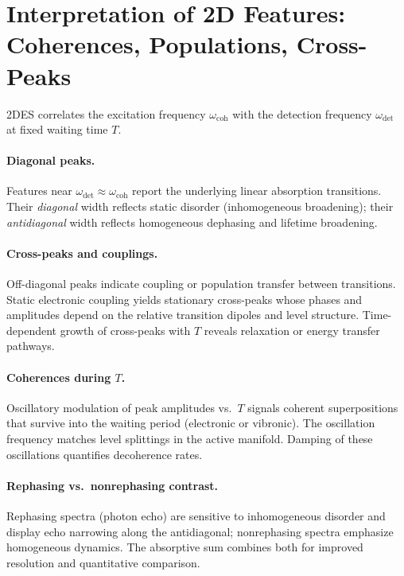 \section{Interpretation of 2D Features: Coherences, Populations, Cross-Peaks}
\label{copy:sec:interpretation}
\noindent
2DES correlates the excitation frequency $\omega_{\mathrm{coh}}$ with the detection frequency $\omega_{\mathrm{det}}$ at fixed waiting time $T$.

\paragraph{Diagonal peaks.}
Features near $\omega_{\mathrm{det}}\!\approx\!\omega_{\mathrm{coh}}$ report the underlying linear absorption transitions. Their \emph{diagonal} width reflects static disorder (inhomogeneous broadening); their \emph{antidiagonal} width reflects homogeneous dephasing and lifetime broadening.

\paragraph{Cross-peaks and couplings.}
Off-diagonal peaks indicate coupling or population transfer between transitions. Static electronic coupling yields stationary cross-peaks whose phases and amplitudes depend on the relative transition dipoles and level structure. Time-dependent growth of cross-peaks with $T$ reveals relaxation or energy transfer pathways.

\paragraph{Coherences during $T$.}
Oscillatory modulation of peak amplitudes vs.\ $T$ signals coherent superpositions that survive into the waiting period (electronic or vibronic). The oscillation frequency matches level splittings in the active manifold. Damping of these oscillations quantifies decoherence rates.

\paragraph{Rephasing vs.\ nonrephasing contrast.}
Rephasing spectra (photon echo) are sensitive to inhomogeneous disorder and display echo narrowing along the antidiagonal; nonrephasing spectra emphasize homogeneous dynamics. The absorptive sum combines both for improved resolution and quantitative comparison.

